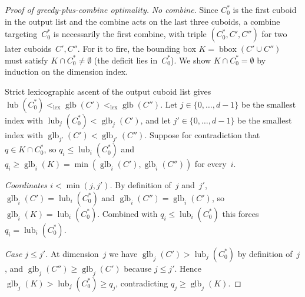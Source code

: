 \documentclass[manuscript,screen,review]{acmart}
\theoremstyle{definition}
\theoremstyle{plain}
\begin{document}
\begin{proof}[Proof of greedy-plus-combine optimality]
\emph{No combine.}
Since $C^*_0$ is the first cuboid in the output list and the combine acts on the last three cuboids, a combine targeting~$C^*_0$ is necessarily the first combine, with triple $(C^*_0, C', C'')$ for two later cuboids~$C', C''$.  For it to fire, the bounding box $K = \operatorname{bbox}(C' \cup C'')$ must satisfy $K \cap C^*_0 \neq \emptyset$ (the deficit lies in~$C^*_0$).  We show $K \cap C^*_0 = \emptyset$ by induction on the dimension index.

Strict lexicographic ascent of the output cuboid list gives $\operatorname{lub}(C^*_0) <_{\mathrm{lex}} \operatorname{glb}(C') <_{\mathrm{lex}} \operatorname{glb}(C'')$.  Let $j \in \{0, \ldots, d{-}1\}$ be the smallest index with $\operatorname{lub}_j(C^*_0) < \operatorname{glb}_j(C')$, and let $j' \in \{0, \ldots, d{-}1\}$ be the smallest index with $\operatorname{glb}_{j'}(C') < \operatorname{glb}_{j'}(C'')$.  Suppose for contradiction that $q \in K \cap C^*_0$, so $q_i \leq \operatorname{lub}_i(C^*_0)$ and $q_i \geq \operatorname{glb}_i(K) = \min(\operatorname{glb}_i(C'), \operatorname{glb}_i(C''))$ for every~$i$.

\emph{Coordinates $i < \min(j, j')$.}
By definition of~$j$ and~$j'$, $\operatorname{glb}_i(C') = \operatorname{lub}_i(C^*_0)$ and $\operatorname{glb}_i(C'') = \operatorname{glb}_i(C')$, so $\operatorname{glb}_i(K) = \operatorname{lub}_i(C^*_0)$.  Combined with $q_i \leq \operatorname{lub}_i(C^*_0)$ this forces $q_i = \operatorname{lub}_i(C^*_0)$.

\emph{Case $j \leq j'$.}
At dimension~$j$ we have $\operatorname{glb}_j(C') > \operatorname{lub}_j(C^*_0)$ by definition of~$j$, and $\operatorname{glb}_j(C'') \geq \operatorname{glb}_j(C')$ because $j \leq j'$.  Hence $\operatorname{glb}_j(K) > \operatorname{lub}_j(C^*_0) \geq q_j$, contradicting $q_j \geq \operatorname{glb}_j(K)$.


\end{proof}
\end{document}
